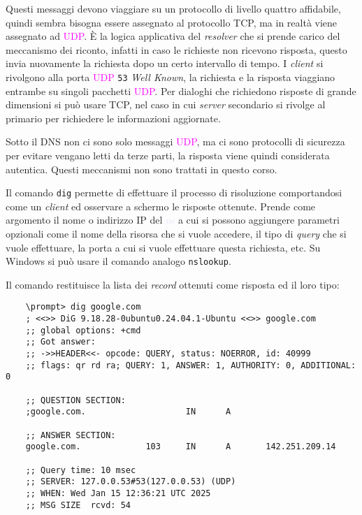 \documentclass{article}
\numberwithin{equation}{subsection}
\begin{document}
Questi messaggi devono viaggiare su un protocollo di livello quattro affidabile, quindi sembra bisogna essere assegnato al protocollo \textcolor{Bittersweet}{TCP}, ma in realtà viene assegnato ad \textcolor{Fuchsia}{UDP}. 
\`{E} la logica applicativa del \textit{resolver} che si prende carico del meccanismo dei riconto, infatti in caso le richieste non ricevono risposta, questo invia nuovamente la richiesta dopo un certo intervallo di tempo. 
I \textit{client} si rivolgono alla porta \textcolor{Fuchsia}{UDP} \texttt{53} \textit{Well Known}, la richiesta e la risposta viaggiano entrambe su singoli pacchetti \textcolor{Fuchsia}{UDP}. 
Per dialoghi che richiedono risposte di grande dimensioni si può usare \textcolor{Bittersweet}{TCP}, nel caso in cui \textit{server} secondario si rivolge al primario per richiedere le informazioni aggiornate. 

Sotto il \textcolor{Mahogany}{DNS} non ci sono solo messaggi \textcolor{Fuchsia}{UDP}, ma ci sono protocolli di sicurezza per evitare vengano letti da terze parti, la risposta viene quindi considerata 
autentica. Questi meccanismi non sono trattati in questo corso. 

Il comando \verb|dig| permette di effettuare il processo di risoluzione comportandosi come un \textit{client} ed osservare a schermo le risposte ottenute. Prende come argomento il nome o indirizzo \textcolor{Bittersweet}{IP} del \textcolor{Lavender}{ns} a cui si possono aggiungere parametri opzionali come il nome della risorsa che si vuole accedere, il tipo di \textit{query} che si vuole effettuare, la porta a cui si vuole effettuare questa richiesta, etc. Su Windows si può usare il comando analogo \verb|nslookup|. 

Il comando restituisce la lista dei \textit{record} ottenuti come risposta ed il loro tipo: 
\begin{verbatim}
    \prompt> dig google.com
    ; <<>> DiG 9.18.28-0ubuntu0.24.04.1-Ubuntu <<>> google.com
    ;; global options: +cmd
    ;; Got answer:
    ;; ->>HEADER<<- opcode: QUERY, status: NOERROR, id: 40999
    ;; flags: qr rd ra; QUERY: 1, ANSWER: 1, AUTHORITY: 0, ADDITIONAL: 0

    ;; QUESTION SECTION:
    ;google.com.                    IN      A

    ;; ANSWER SECTION:
    google.com.             103     IN      A       142.251.209.14

    ;; Query time: 10 msec
    ;; SERVER: 127.0.0.53#53(127.0.0.53) (UDP)
    ;; WHEN: Wed Jan 15 12:36:21 UTC 2025
    ;; MSG SIZE  rcvd: 54
\end{verbatim}
\end{document}
